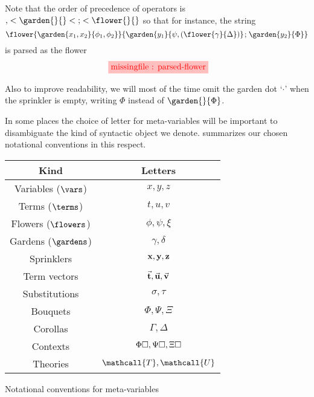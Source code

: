 Note that the order of precedence of operators is
$\mathop{,} < \garden{{}}{{}} < \mathop{;} < \mathop{\flower{}{}}$
so that for instance, the string
$$\flower{\garden{x_1, x_2}{\phi_1, \phi_2}}{\garden{y_1}{\psi, (\flower{\gamma}{\Delta})} \sep \garden{y_2}{\Phi}}$$
is parsed as the flower
\vspace{-6em}
$$\stkfig{1}{parsed-flower}$$
\vspace{-6em}

Also to improve readability, we will most of the time omit the garden dot
`$\cdot$' when the sprinkler is empty, writing $\Phi$ instead of
$\garden{{}}{\Phi}$.

\begin{remark}
  In some places the choice of letter for meta-variables will be important to
  disambiguate the kind of syntactic object we denote. 
  summarizes our chosen notational conventions in this respect.
\end{remark}

\begin{marginfigure}
  \centering
  \begin{tabular}{|c|c|}
    \hline
    \bfseries Kind & \bfseries Letters \\
    \hline
    Variables ($\vars$) & $x, y, z$ \\
    Terms ($\terms$) & $t, u, v$ \\
    Flowers ($\flowers$) & $\phi, \psi, \xi$ \\
    Gardens ($\gardens$) & $\gamma, \delta$ \\
    Sprinklers & $\mathbf{x}, \mathbf{y}, \mathbf{z}$ \\
    Term vectors & $\vec{\mathbf{t}}, \vec{\mathbf{u}}, \vec{\mathbf{v}}$ \\
    Substitutions & $\sigma, \tau$ \\
    Bouquets & $\Phi, \Psi, \Xi$ \\
    Corollas & $\Gamma, \Delta$ \\
    Contexts & $\Phi\square, \Psi\square, \Xi\square$ \\
    Theories & $\mathcall{T}, \mathcall{U}$ \\
    \hline
  \end{tabular}
  \caption{Notational conventions for meta-variables}
\end{marginfigure}


